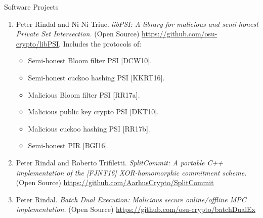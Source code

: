 \documentclass{resume} %
\begin{document}
\begin{rSection}{Software Projects}
\begin{enumerate}[label=S\arabic* --]
		\item Peter Rindal and Ni Ni Triue. \emph{libPSI: A library for malicious and semi-honest Private Set Intersection.} (Open Source) \url{https://github.com/osu-crypto/libPSI}. Includes the protocols of:
		\begin{itemize}		
		\item Semi-honest Bloom filter PSI [DCW10]. 
		\item Semi-honest cuckoo hashing PSI [KKRT16]. 
		\item Malicious Bloom filter PSI [RR17a]. 
		\item Malicious public key crypto PSI [DKT10]. 
		\item Malicious cuckoo hashing PSI [RR17b]. 
		\item Semi-honest PIR [BGI16].		
	\end{itemize}

		\item Peter Rindal and Roberto Trifiletti. \emph{SplitCommit: A portable C++ implementation of the [FJNT16] XOR-homomorphic commitment scheme.} (Open Source) \url{https://github.com/AarhusCrypto/SplitCommit}
		
		\item Peter Rindal. \emph{Batch Dual Execution: Malicious secure online/offline MPC implementation.}  (Open Source) \url{https://github.com/osu-crypto/batchDualEx}
	\end{enumerate}
	
\end{rSection}



\end{document}
